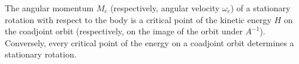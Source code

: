 The angular momentum $M_c$ (respectively, angular velocity $\omega_c$) of a stationary rotation with respect to the body is a critical point of the kinetic energy $H$ on the coadjoint orbit (respectively, on the image of the orbit under $A^{-1}$). Conversely, every critical point of the energy on a coadjoint orbit determines a stationary rotation.
